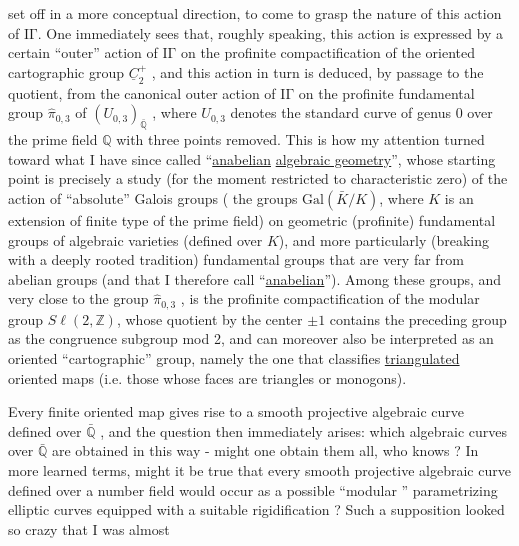 
set off in a more conceptual direction, to come to
grasp the nature of this action of $\mathrm{I\!\Gamma}$. One immediately sees
that, roughly speaking, this action is expressed by a certain
``outer'' action of $\mathrm{I\!\Gamma}$ on the profinite compactification
of the oriented cartographic group $\underline{C}_2^{+}$ , and this action in turn
is deduced, by passage to the quotient, from the canonical outer
action of $\mathrm{I\!\Gamma}$ on the profinite fundamental group $\hat{\pi}_{0,3}$ of $(U_{0,3})_{\bar{\mathbb{Q}}}$ ,
where $U_{0,3}$ denotes the standard curve of genus $0$ over the prime field
$\mathbb{Q}$ with three points removed. This is how my attention
turned toward what I have since called ``\uline{anabelian}
\uline{algebraic geometry}'', whose starting point is precisely a study
(for the moment restricted to characteristic zero) of the action
of ``absolute'' Galois groups (
the groups $\mathrm{Gal}(\bar{K}/K)$,
where $K$ is an extension of finite type of the prime field) on
geometric (profinite) fundamental groups of algebraic varieties
(defined over $K$), and more particularly (breaking with
a deeply rooted tradition) fundamental groups that are
very far from abelian groups (and that I therefore
call ``\uline{anabelian}''). Among these groups, and very close to the group
$\hat{\pi}_{0,3}$ , is the profinite compactification of the modular group $S\ell(2,\mathbb{Z})$,
whose quotient by the center $\pm 1$ contains the preceding group as
the congruence subgroup mod 2, and can moreover also be interpreted
as an oriented ``cartographic'' group, namely the one
that classifies \uline{triangulated} oriented maps (i.e. those whose
faces are triangles or monogons).

Every finite oriented map gives rise to a smooth projective
algebraic curve defined over $\bar{\mathbb{Q}}$ , and the question then immediately
arises: which algebraic curves over $\bar{\mathbb{Q}}$ are obtained
in this way - might one obtain them all, who knows ?
In more learned terms, might it be true that every smooth projective
algebraic curve defined over a number field would occur
as a possible ``modular ''
parametrizing elliptic curves
equipped with a suitable rigidification ? Such a
supposition looked so crazy that I was almost


